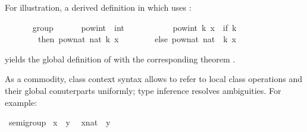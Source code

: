 \begin{isabellebody}
\begin{isamarkuptext}
  For illustration, a derived definition
  in  which uses :%
\end{isamarkuptext}%
\isamarkuptrue%
\ \ \ \ \isamarkupfalse%
\ {\isacharparenleft}\ group{\isacharparenright}\isanewline
\ \ \ \ \ \ pow{\isacharunderscore}int\ {\isacharcolon}{\isacharcolon}\ {\isachardoublequoteopen}int\ {\isasymRightarrow}\ {\isasymalpha}\ {\isasymRightarrow}\ {\isasymalpha}{\isachardoublequoteclose}\ \isanewline
\ \ \ \ \ \ {\isachardoublequoteopen}pow{\isacharunderscore}int\ k\ x\ {\isacharequal}\ {\isacharparenleft}if\ k\ {\isachargreater}{\isacharequal}\ {}\isanewline
\ \ \ \ \ \ \ \ then\ pow{\isacharunderscore}nat\ {\isacharparenleft}nat\ k{\isacharparenright}\ x\isanewline
\ \ \ \ \ \ \ \ else\ {\isacharparenleft}pow{\isacharunderscore}nat\ {\isacharparenleft}nat\ {\isacharparenleft}{\isacharminus}\ k{\isacharparenright}{\isacharparenright}\ x{\isacharparenright}{\isasymdiv}{\isacharparenright}{\isachardoublequoteclose}%
\begin{isamarkuptext}%
\noindent yields the global definition of
  with the corresponding theorem .%
\end{isamarkuptext}%
\isamarkuptrue%
%
\isamarkuptrue%
%
\begin{isamarkuptext}%
As a commodity, class context syntax allows to refer
  to local class operations and their global conuterparts
  uniformly;  type inference resolves ambiguities.  For example:%
\end{isamarkuptext}%
\isamarkuptrue%
\isamarkupfalse%
\ semigroup\isanewline
{}\isanewline
\isanewline
{}\isamarkupfalse%
\ {\isachardoublequoteopen}x\ {\isasymotimes}\ y{\isachardoublequoteclose}\ %
\isanewline
{}\isamarkupfalse%
\ {\isachardoublequoteopen}{\isacharparenleft}x{\isasymColon}nat{\isacharparenright}\ {\isasymotimes}\ y{\isachardoublequoteclose}\ %

\end{isabellebody}
